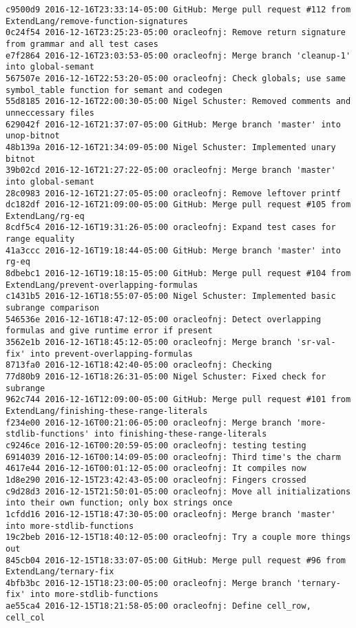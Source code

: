 \begin{lstlisting}
c9500d9 2016-12-16T23:33:14-05:00 GitHub: Merge pull request #112 from ExtendLang/remove-function-signatures
0c24f54 2016-12-16T23:25:23-05:00 oracleofnj: Remove return signature from grammar and all test cases
e7f2864 2016-12-16T23:03:53-05:00 oracleofnj: Merge branch 'cleanup-1' into global-semant
567507e 2016-12-16T22:53:20-05:00 oracleofnj: Check globals; use same symbol_table function for semant and codegen
55d8185 2016-12-16T22:00:30-05:00 Nigel Schuster: Removed comments and unneccessary files
629042f 2016-12-16T21:37:07-05:00 GitHub: Merge branch 'master' into unop-bitnot
48b139a 2016-12-16T21:34:09-05:00 Nigel Schuster: Implemented unary bitnot
39b02cd 2016-12-16T21:27:22-05:00 oracleofnj: Merge branch 'master' into global-semant
28c0983 2016-12-16T21:27:05-05:00 oracleofnj: Remove leftover printf
dc182df 2016-12-16T21:09:00-05:00 GitHub: Merge pull request #105 from ExtendLang/rg-eq
8cdf5c4 2016-12-16T19:31:26-05:00 oracleofnj: Expand test cases for range equality
41a3ccc 2016-12-16T19:18:44-05:00 GitHub: Merge branch 'master' into rg-eq
8dbebc1 2016-12-16T19:18:15-05:00 GitHub: Merge pull request #104 from ExtendLang/prevent-overlapping-formulas
c1431b5 2016-12-16T18:55:07-05:00 Nigel Schuster: Implemented basic subrange comparison
546536e 2016-12-16T18:47:12-05:00 oracleofnj: Detect overlapping formulas and give runtime error if present
3562e1b 2016-12-16T18:45:12-05:00 oracleofnj: Merge branch 'sr-val-fix' into prevent-overlapping-formulas
8713fa0 2016-12-16T18:42:40-05:00 oracleofnj: Checking
77d80b9 2016-12-16T18:26:31-05:00 Nigel Schuster: Fixed check for subrange
962c744 2016-12-16T12:09:00-05:00 GitHub: Merge pull request #101 from ExtendLang/finishing-these-range-literals
f234e00 2016-12-16T00:21:06-05:00 oracleofnj: Merge branch 'more-stdlib-functions' into finishing-these-range-literals
c9246ce 2016-12-16T00:20:59-05:00 oracleofnj: testing testing
6914039 2016-12-16T00:14:09-05:00 oracleofnj: Third time's the charm
4617e44 2016-12-16T00:01:12-05:00 oracleofnj: It compiles now
1d8e290 2016-12-15T23:42:43-05:00 oracleofnj: Fingers crossed
c9d28d3 2016-12-15T21:50:01-05:00 oracleofnj: Move all initializations into their own function; only box strings once
1cfdd16 2016-12-15T18:47:30-05:00 oracleofnj: Merge branch 'master' into more-stdlib-functions
19c2beb 2016-12-15T18:40:12-05:00 oracleofnj: Try a couple more things out
845cb04 2016-12-15T18:33:07-05:00 GitHub: Merge pull request #96 from ExtendLang/ternary-fix
4bfb3bc 2016-12-15T18:23:00-05:00 oracleofnj: Merge branch 'ternary-fix' into more-stdlib-functions
ae55ca4 2016-12-15T18:21:58-05:00 oracleofnj: Define cell_row, cell_col

\end{lstlisting}
